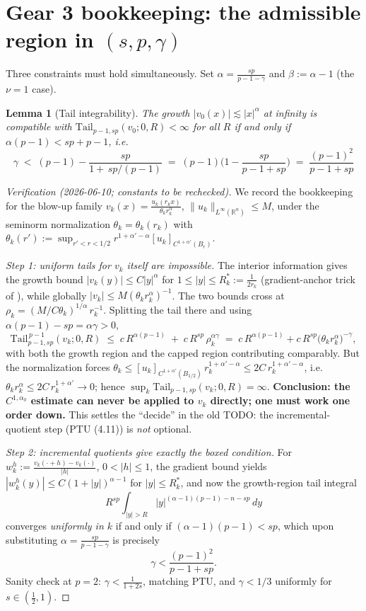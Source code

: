 \documentclass[11pt]{amsart}
\theoremstyle{plain}
\newtheorem{lemma}[theorem]{Lemma}
\theoremstyle{definition}
\theoremstyle{remark}
\newcommand{\R}{\mathbb{R}}
\newcommand{\al}{\alpha}
\newcommand{\Tail}{\mathrm{Tail}_{p-1,sp}}
\begin{document}
\section{Gear 3 bookkeeping: the admissible region in $(s,p,\gamma)$}\label{sec:constraints}
Three constraints must hold simultaneously. Set $\al=\frac{sp}{p-1-\gamma}$
and $\beta:=\al-1$ (the $\nu=1$ case).
\begin{lemma}[Tail integrability]\label{lem:tail}
The growth $|v_0(x)|\lesssim |x|^{\al}$ at infinity is compatible with
$\Tail(v_0;0,R)<\infty$ for all $R$ if and only if $\al(p-1)<sp+p-1$,
i.e.
\[
  \boxed{\;\gamma \;<\; (p-1)-\frac{sp}{1+\,sp/(p-1)}
  \;=\;(p-1)\Big(1-\frac{sp}{p-1+sp}\Big)
  \;=\;\frac{(p-1)^2}{p-1+sp}\;}
\]
\end{lemma}
\begin{proof}[Verification (2026-06-10; constants to be rechecked)]
We record the bookkeeping for the blow-up family
$v_k(x)=\frac{u_k(r_kx)}{\theta_k r_k^{\al}}$, $\|u_k\|_{L^\infty(\R^n)}\le M$,
under the seminorm normalization
$\theta_k=\theta_k(r_k)$ with
$\theta_k(r'):=\sup_{r'<r<1/2} r^{1+\al'-\al}[u_k]_{C^{1+\al'}(B_r)}$.

\emph{Step 1: uniform tails for $v_k$ itself are impossible.}
The interior information gives the growth bound $|v_k(y)|\le C|y|^{\al}$
for $1\le|y|\le R^*_k:=\tfrac{1}{2r_k}$ (gradient-anchor trick of
\cite{CP}), while globally $|v_k|\le M(\theta_k r_k^{\al})^{-1}$.
The two bounds cross at
$\rho_k=(M/C\theta_k)^{1/\al}\,r_k^{-1}$. Splitting the tail there and
using $\al(p-1)-sp=\al\gamma>0$,
\[
  \Tail^{\,p-1}(v_k;0,R)
  \;\le\; c\,R^{\al(p-1)}
  \;+\; c\,R^{sp}\,\rho_k^{\al\gamma}
  \;=\; c\,R^{\al(p-1)} + c\,R^{sp}\big(\theta_k r_k^{\al}\big)^{-\gamma},
\]
with both the growth region and the capped region contributing
comparably. But the normalization forces
$\theta_k\le [u_k]_{C^{1+\al'}(B_{1/2})}\, r_k^{1+\al'-\al}\le
2C\,r_k^{1+\al'-\al}$, i.e.\ $\theta_k r_k^{\al}\le 2C\,r_k^{1+\al'}\to0$;
hence $\sup_k\Tail(v_k;0,R)=\infty$. \textbf{Conclusion: the
$C^{1,\al_0}$ estimate can never be applied to $v_k$ directly; one must
work one order down.} This settles the ``decide'' in the old TODO: the
incremental-quotient step (PTU (4.11)) is \emph{not} optional.

\emph{Step 2: incremental quotients give exactly the boxed condition.}
For $w_k^h:=\frac{v_k(\cdot+h)-v_k(\cdot)}{|h|}$, $0<|h|\le1$, the
gradient bound yields $|w_k^h(y)|\le C(1+|y|)^{\al-1}$ for
$|y|\le R^*_k$, and now the growth-region tail integral
\[
  R^{sp}\int_{|y|>R}|y|^{(\al-1)(p-1)-n-sp}\,dy
\]
converges \emph{uniformly in $k$} if and only if $(\al-1)(p-1)<sp$,
which upon substituting $\al=\frac{sp}{p-1-\gamma}$ is precisely
\[
  \gamma<\frac{(p-1)^2}{p-1+sp}.
\]
Sanity check at $p=2$: $\gamma<\frac{1}{1+2s}$, matching PTU, and
$\gamma<1/3$ uniformly for $s\in(\frac12,1)$. \checkmark


\end{proof}
\end{document}
